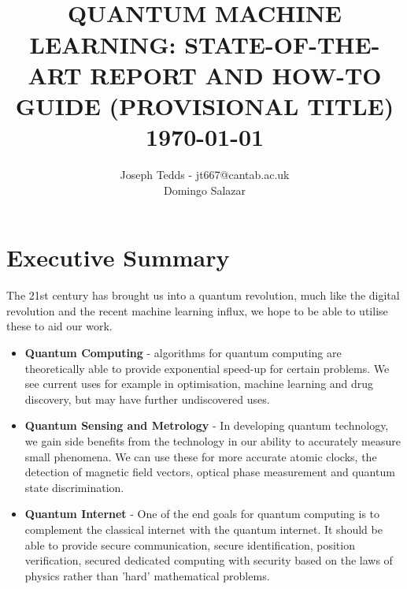 \documentclass{article}
\title{
			\HRule{0.5pt} \\						%
			\LARGE \textbf{\uppercase{Quantum Machine Learning: State-of-the-Art Report and How-to Guide (Provisional Title)}}	%
			\HRule{2pt} \\ [0.5cm]		%
			\normalsize \today			%
		}
\author{Joseph Tedds - jt667@cantab.ac.uk \\
 Domingo Salazar}
\theoremstyle{definition}
\begin{document}
\maketitle
\clearpage



\section{Executive Summary}
The 21st century has brought us into a quantum revolution, much like the digital revolution and the recent machine learning influx, we hope to be able to utilise these to aid our work.

\begin{itemize}
\item \textbf{Quantum Computing} - algorithms for quantum computing are theoretically able to provide exponential speed-up for certain problems. We see current uses for example in optimisation, machine learning and drug discovery, but may have further undiscovered uses.
\item \textbf{Quantum Sensing and Metrology} - In developing quantum technology, we gain side benefits from the technology in our ability to accurately measure small phenomena. We can use these for more accurate atomic clocks, the detection of magnetic field vectors, optical phase measurement and quantum state discrimination. 
\item \textbf{Quantum Internet} - One of the end goals for quantum computing is to complement the classical internet with the quantum internet. It should be able to provide secure communication, secure identification, position verification, secured dedicated computing with security based on the laws of physics rather than 'hard' mathematical problems.
\end{itemize}
\end{document}
